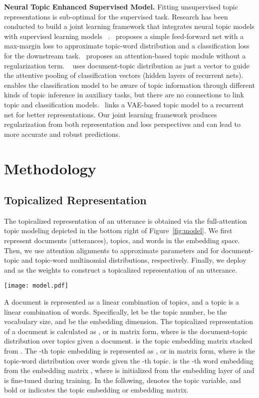 \documentclass{ecai}
\begin{document}
\noindent\textbf{Neural Topic Enhanced Supervised Model.} Fitting unsupervised topic representations is sub-optimal for the supervised task. Research has been conducted to build a joint learning framework that integrates neural topic models with supervised learning models ~\cite{cao2015novel,pergola2019tdam,wang2020sentiment,wang2020neural,wang2020end}.~\cite{cao2015novel} proposes a simple feed-forward net with a max-margin loss to approximate topic-word distribution and a classification loss for the downstream task.~\cite{pergola2019tdam} proposes an attention-based topic module without a regularization term. ~\cite{wang2020end} uses document-topic distribution as just a vector to guide the attentive pooling of classification vectors (hidden layers of recurrent nets). ~\cite{wang2020sentiment} enables the classification model to be aware of topic information through different kinds of topic inference in auxiliary tasks, but there are no connections to link topic and classification models.~\cite{wang2020neural} links a VAE-based topic model to a recurrent net for better representations. Our joint learning framework produces regularization from both representation and loss perspectives and can lead to more accurate and robust predictions.

\section{Methodology}
\subsection{Topicalized Representation}
The topicalized representation of an utterance is obtained via the full-attention topic modeling depicted in the bottom right of Figure~\ref{fig:model}. We first represent documents (utterances), topics, and words in the embedding space. Then, we use attention alignments to approximate parameters  and  for document-topic and topic-word multinomial distributions, respectively. Finally, we deploy  and  as the weights to construct a topicalized representation of an utterance.

\begin{figure*}[t]
  \centering
  \texttt{[image: model.pdf]}
  \caption{Joint modeling framework}
  \label{fig:model}
\end{figure*}

A document is represented as a linear combination of topics, and a topic is a linear combination of words. Specifically, let  be the topic number,  be the vocabulary size, and  be the embedding dimension. The topicalized representation of a document is calculated as , or  in matrix form, where  is the document-topic distribution over  topics given a document.  is the topic embedding matrix stacked from . The -th topic embedding  is represented as , or  in matrix form, where  is the topic-word distribution over  words given the -th topic.  is the -th word embedding from the embedding matrix , where  is initialized from the embedding layer of  and is fine-tuned during training. In the following,  denotes the topic variable, and bold  or  indicates the topic embedding or embedding matrix.
\end{document}
